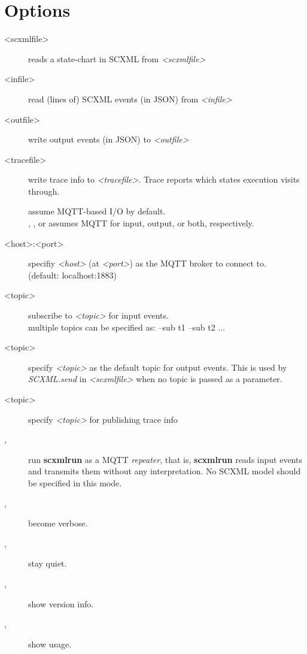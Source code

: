 \documentclass[fancy]{article}
\begin{document}
\section{Options}
\begin{description}
%
\item[ <scxmlfile>]
  reads a state-chart in SCXML from \emph{<scxmlfile>}

\item[ <infile>]
  read (lines of) SCXML events (in JSON) from \emph{<infile>}
%
\item[ <outfile>]
  write output events (in JSON) to \emph{<outfile>}
%
\item[ <tracefile>]
  write trace info to \emph{<tracefile>}.
  Trace reports which states execution visits through.
%

\item[]
  assume MQTT-based I/O by default.\\
  , , or 
  assumes MQTT for input, output, or both, respectively.

%
\item[ <host>\Lbr:<port>\Rbr]
  specifiy \emph{<host>} (at \emph{<port>}) as the MQTT broker to connect to.\\
  (default: localhost:1883)
%
\item[ <topic>]
  subscribe to \emph{<topic>} for input events.\\
  multiple topics can be specified as: --sub t1 --sub t2 ...
%
\item[ <topic>]
  specify \emph{<topic>} as the default topic for output events.
  This is used by \emph{SCXML.send} in \emph{<scxmlfile>} when no topic is passed as a parameter.
%
\item[ <topic>]
  specify \emph{<topic>} for publishing trace info

\item[, ]
  run \textbf{scxmlrun} as a MQTT \emph{repeater}, that is,
  \textbf{scxmlrun} reads input events and transmits them without any interpretation.
  No SCXML model should be specified in this mode.

\item[, ]
  become verbose.
%
\item[, ]
  stay quiet.
%
\item[, ]
  show version info.
%
\item[, ]
  show usage.

\end{description}
\end{document}
